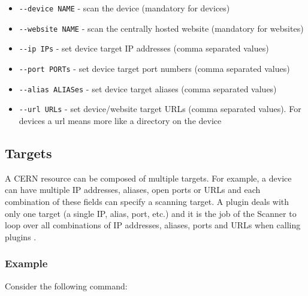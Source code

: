 \begin{itemize}

    \item    \texttt{-{}-device NAME} - scan the device (mandatory for devices)
    \item    \texttt{-{}-website NAME} - scan the centrally hosted website (mandatory for websites)
    \item    \texttt{-{}-ip IPs} - set device target IP addresses (comma separated values)
    \item    \texttt{-{}-port PORTs} - set device target port numbers (comma separated values)
    \item    \texttt{-{}-alias ALIASes} - set device target aliases (comma separated values)
    \item    \texttt{-{}-url URLs} - set device/website target URLs (comma separated values). For devices a url means more like a directory on the device 
   \end{itemize}
   


\subsection{Targets}
A CERN resource can be composed of multiple targets. For example, a device can have multiple IP addresses, aliases, open ports or URLs and each combination of these fields can specify a scanning target. A plugin deals with only one target (a single IP, alias, port, etc.) and it is the job of the Scanner to loop over all combinations of IP addresses, aliases, ports and URLs when calling plugins .
\subsubsection{Example}
Consider the following command:

